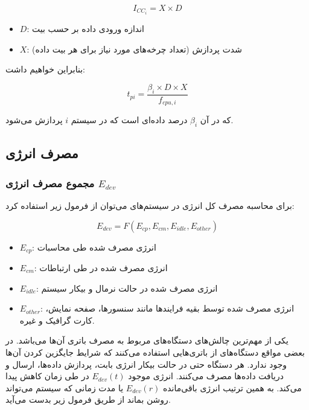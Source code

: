 \documentclass[a4paper]{article}
\begin{document}
\begin{equation}
    I_{CC_i} = X \times D
\end{equation}

\begin{itemize}
    \item $D$: اندازه ورودی داده بر حسب بیت
    \item $X$: شدت پردازش (تعداد چرخه‌های مورد نیاز برای هر بیت داده)
\end{itemize}

بنابراین خواهیم داشت:

\begin{equation}
    t_{pi} = \frac{\beta_i \times D \times X}{f_{cpu, i}}
\end{equation}

که در آن $\beta_{i}$ درصد داده‌‌ای است که در سیستم $i$ پردازش می‌شود.

\subsection{مصرف انرژی}

\subsubsection{مجموع مصرف انرژی $E_{dev}$}

برای محاسبه مصرف کل انرژی در سیستم‌های  می‌توان از فرمول زیر استفاده
کرد:

\begin{equation}
    E_{dev} = F(E_{cp}, E_{cm}, E_{idle}, E_{other})
\end{equation}

\begin{itemize}
    \item $E_{cp}$: انرژی مصرف شده طی محاسبات
    \item $E_{cm}$: انرژی مصرف شده در طی ارتباطات
    \item $E_{idle}$: انرژی مصرف شده در حالت نرمال و بیکار سیستم
    \item $E_{other}$: انرژی مصرف شده توسط بقیه فرایند‌ها مانند سنسور‌ها، صفحه
    نمایش، کارت گرافیک و غیره.
\end{itemize}



یکی از مهم‌ترین چالش‌های دستگاه‌های  مربوط به مصرف باتری آن‌ها می‌باشد.
در بعضی مواقع دستگاه‌های  از باتری‌هایی استفاده می‌کنند که شرایط جایگزین
کردن آن‌ها وجود ندارد. هر دستگاه  حتی در حالت بیکار انرژی بابت، پردازش
داده‌ها، ارسال و دریافت داده‌ها مصرف می‌کنند. انرژی موجود $E_{dev}(t)$ در طی
زمان کاهش پیدا می‌کند. به همین ترتیب انرژی باقی‌مانده $E_{dev}(r)$ یا مدت زمانی
که سیستم می‌تواند روشن بماند از طریق فرمول زیر بدست می‌آید.
\end{document}
